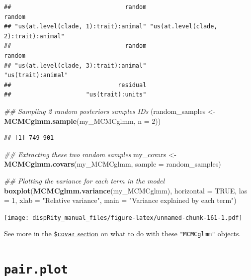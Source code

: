 \documentclass[
]{book}
\newenvironment{Shaded}{\begin{snugshade}}{\end{snugshade}}
\newcommand{\CommentTok}[1]{\textcolor[rgb]{0.56,0.35,0.01}{\textit{#1}}}
\newcommand{\DataTypeTok}[1]{\textcolor[rgb]{0.13,0.29,0.53}{#1}}
\newcommand{\DecValTok}[1]{\textcolor[rgb]{0.00,0.00,0.81}{#1}}
\newcommand{\KeywordTok}[1]{\textcolor[rgb]{0.13,0.29,0.53}{\textbf{#1}}}
\newcommand{\NormalTok}[1]{#1}
\newcommand{\OtherTok}[1]{\textcolor[rgb]{0.56,0.35,0.01}{#1}}
\newcommand{\StringTok}[1]{\textcolor[rgb]{0.31,0.60,0.02}{#1}}
\begin{document}
\begin{verbatim}
##                                random                                random 
## "us(at.level(clade, 1):trait):animal" "us(at.level(clade, 2):trait):animal" 
##                                random                                random 
## "us(at.level(clade, 3):trait):animal"                    "us(trait):animal" 
##                              residual 
##                     "us(trait):units"
\end{verbatim}

\begin{Shaded}
\begin{Highlighting}[]
\CommentTok{\#\# Sampling 2 random posteriors samples IDs}
\NormalTok{(random\_samples \textless{}{-}}\StringTok{ }\KeywordTok{MCMCglmm.sample}\NormalTok{(my\_MCMCglmm, }\DataTypeTok{n =} \DecValTok{2}\NormalTok{))}
\end{Highlighting}
\end{Shaded}

\begin{verbatim}
## [1] 749 901
\end{verbatim}

\begin{Shaded}
\begin{Highlighting}[]
\CommentTok{\#\# Extracting these two random samples}
\NormalTok{my\_covars \textless{}{-}}\StringTok{ }\KeywordTok{MCMCglmm.covars}\NormalTok{(my\_MCMCglmm, }\DataTypeTok{sample =}\NormalTok{ random\_samples)}

\CommentTok{\#\# Plotting the variance for each term in the model}
\KeywordTok{boxplot}\NormalTok{(}\KeywordTok{MCMCglmm.variance}\NormalTok{(my\_MCMCglmm), }\DataTypeTok{horizontal =} \OtherTok{TRUE}\NormalTok{, }\DataTypeTok{las =} \DecValTok{1}\NormalTok{,}
        \DataTypeTok{xlab =} \StringTok{"Relative variance"}\NormalTok{,}
        \DataTypeTok{main =} \StringTok{"Variance explained by each term"}\NormalTok{)}
\end{Highlighting}
\end{Shaded}

\texttt{[image: dispRity\_manual\_files/figure-latex/unnamed-chunk-161-1.pdf]}

See more in the \protect\hyperlink{covar}{\texttt{\$covar} section} on what to do with these \texttt{"MCMCglmm"} objects.

\hypertarget{pair.plot}{%
\section{\texorpdfstring{\texttt{pair.plot}}{pair.plot}}\label{pair.plot}}
\end{document}
